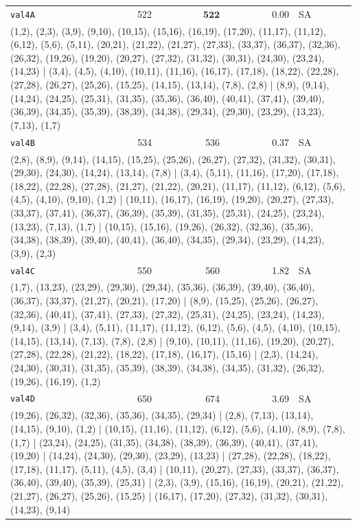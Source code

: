 \begin{longtable}{lrrrl}
\texttt{val4A} & 522 & $\mathbf{522}$ & 0.00 & SA \\
\multicolumn{5}{p{0.96\linewidth}}{\tiny\raggedright\arraybackslash (1,2), (2,3), (3,9), (9,10), (10,15), (15,16), (16,19), (17,20), (11,17), (11,12), (6,12), (5,6), (5,11), (20,21), (21,22), (21,27), (27,33), (33,37), (36,37), (32,36), (26,32), (19,26), (19,20), (20,27), (27,32), (31,32), (30,31), (24,30), (23,24), (14,23) | (3,4), (4,5), (4,10), (10,11), (11,16), (16,17), (17,18), (18,22), (22,28), (27,28), (26,27), (25,26), (15,25), (14,15), (13,14), (7,8), (2,8) | (8,9), (9,14), (14,24), (24,25), (25,31), (31,35), (35,36), (36,40), (40,41), (37,41), (39,40), (36,39), (34,35), (35,39), (38,39), (34,38), (29,34), (29,30), (23,29), (13,23), (7,13), (1,7)} \\[2pt]
\texttt{val4B} & 534 & 536 & 0.37 & SA \\
\multicolumn{5}{p{0.96\linewidth}}{\tiny\raggedright\arraybackslash (2,8), (8,9), (9,14), (14,15), (15,25), (25,26), (26,27), (27,32), (31,32), (30,31), (29,30), (24,30), (14,24), (13,14), (7,8) | (3,4), (5,11), (11,16), (17,20), (17,18), (18,22), (22,28), (27,28), (21,27), (21,22), (20,21), (11,17), (11,12), (6,12), (5,6), (4,5), (4,10), (9,10), (1,2) | (10,11), (16,17), (16,19), (19,20), (20,27), (27,33), (33,37), (37,41), (36,37), (36,39), (35,39), (31,35), (25,31), (24,25), (23,24), (13,23), (7,13), (1,7) | (10,15), (15,16), (19,26), (26,32), (32,36), (35,36), (34,38), (38,39), (39,40), (40,41), (36,40), (34,35), (29,34), (23,29), (14,23), (3,9), (2,3)} \\[2pt]
\texttt{val4C} & 550 & 560 & 1.82 & SA \\
\multicolumn{5}{p{0.96\linewidth}}{\tiny\raggedright\arraybackslash (1,7), (13,23), (23,29), (29,30), (29,34), (35,36), (36,39), (39,40), (36,40), (36,37), (33,37), (21,27), (20,21), (17,20) | (8,9), (15,25), (25,26), (26,27), (32,36), (40,41), (37,41), (27,33), (27,32), (25,31), (24,25), (23,24), (14,23), (9,14), (3,9) | (3,4), (5,11), (11,17), (11,12), (6,12), (5,6), (4,5), (4,10), (10,15), (14,15), (13,14), (7,13), (7,8), (2,8) | (9,10), (10,11), (11,16), (19,20), (20,27), (27,28), (22,28), (21,22), (18,22), (17,18), (16,17), (15,16) | (2,3), (14,24), (24,30), (30,31), (31,35), (35,39), (38,39), (34,38), (34,35), (31,32), (26,32), (19,26), (16,19), (1,2)} \\[2pt]
\texttt{val4D} & 650 & 674 & 3.69 & SA \\
\multicolumn{5}{p{0.96\linewidth}}{\tiny\raggedright\arraybackslash (19,26), (26,32), (32,36), (35,36), (34,35), (29,34) | (2,8), (7,13), (13,14), (14,15), (9,10), (1,2) | (10,15), (11,16), (11,12), (6,12), (5,6), (4,10), (8,9), (7,8), (1,7) | (23,24), (24,25), (31,35), (34,38), (38,39), (36,39), (40,41), (37,41), (19,20) | (14,24), (24,30), (29,30), (23,29), (13,23) | (27,28), (22,28), (18,22), (17,18), (11,17), (5,11), (4,5), (3,4) | (10,11), (20,27), (27,33), (33,37), (36,37), (36,40), (39,40), (35,39), (25,31) | (2,3), (3,9), (15,16), (16,19), (20,21), (21,22), (21,27), (26,27), (25,26), (15,25) | (16,17), (17,20), (27,32), (31,32), (30,31), (14,23), (9,14)} \\[2pt]

\end{longtable}
